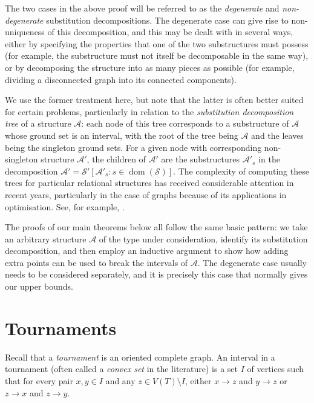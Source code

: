 \documentclass[11pt]{article}
\begin{document}
The two cases in the above proof will be referred to as the \emph{degenerate} and \emph{non-degenerate} substitution decompositions. The degenerate case can give rise to non-uniqueness of this decomposition, and this may be dealt with in several ways, either by specifying the properties that one of the two substructures must possess (for example, the substructure must not itself be decomposable in the same way), or by decomposing the structure into as many pieces as possible (for example, dividing a disconnected graph into its connected components).

We use the former treatment here, but note that the latter is often better suited for certain problems, particularly in relation to the \emph{substitution decomposition tree} of a structure ${\mathcal{A}}$: each node of this tree corresponds to a substructure of ${\mathcal{A}}$ whose ground set is an interval, with the root of the tree being ${\mathcal{A}}$ and the leaves being the singleton ground sets. For a given node with corresponding non-singleton structure ${\mathcal{A}}'$, the children of ${\mathcal{A}}'$ are the substructures ${\mathcal{A}}'_s$ in the decomposition ${\mathcal{A}}'=\mathcal{S}'[{\mathcal{A}}'_s:s\in{\operatorname{dom}}(\mathcal{S})]$. The complexity of computing these trees for particular relational structures has received considerable attention in recent years, particularly in the case of graphs because of its applications in optimisation. See, for example, \cite{bergeron:computing-commo:,cournier:a-new-linear-al:,dahlhaus:efficient-and:,mcconnell:linear-time-digraphs:,mcconnell:modular-decomposition:}.

The proofs of our main theorems below all follow the same basic pattern: we take an arbitrary structure $\mathcal{A}$ of the type under consideration, identify its substitution decomposition, and then employ an inductive argument to show how adding extra points can be used to break the intervals of ${\mathcal{A}}$. The degenerate case usually needs to be considered separately, and it is precisely this case that normally gives our upper bounds.

\section{Tournaments}\label{sec-tournaments}
Recall that a {\it tournament} is an oriented complete graph.
An interval in a tournament (often called a {\it convex set} in the literature) is a set $I$ of vertices such that for every pair $x,y\in I$ and any $z\in V(T)\setminus I$, either $x\rightarrow z$ and $y\rightarrow z$ or $z\rightarrow x$ and $z\rightarrow y$.
\end{document}
